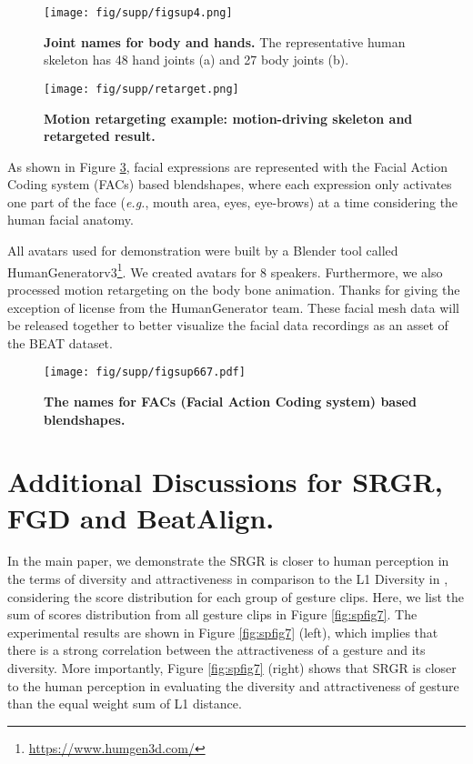 \documentclass[runningheads]{llncs}
\begin{document}
\begin{figure}
\centering
    \texttt{[image: fig/supp/figsup4.png]}
    \caption{\textbf{Joint names for body and hands.} The
representative human skeleton has 48 hand joints (a) and 27 body joints (b).}
    \vspace{-0.5cm}
    \label{fig:spfig3}
\end{figure}

\begin{figure}
\centering
    \texttt{[image: fig/supp/retarget.png]}
    \caption{\textbf{Motion retargeting example: motion-driving skeleton and retargeted result.}}
    \label{fig:spfig5}
\end{figure}

As shown in Figure \ref{fig:spfig4}, facial expressions are represented with the Facial Action Coding system (FACs) based blendshapes, where each expression only activates one part of the face (\textit{e.g.}, mouth area, eyes, eye-brows) at a time considering the human facial anatomy. 

All avatars used for demonstration were built by a Blender tool called HumanGeneratorv3\footnote{\url{https://www.humgen3d.com/}}.
We created avatars for 8 speakers. Furthermore, we also processed motion retargeting on the body bone animation. Thanks for giving the exception of license from the HumanGenerator team. These facial mesh data will be released together to better visualize the facial data recordings as an asset of the BEAT dataset.

\begin{figure}
    \centering
    \texttt{[image: fig/supp/figsup667.pdf]}
    \caption{\textbf{The names for FACs (Facial Action Coding system) based blendshapes.}}
    \label{fig:spfig4}
\end{figure}


\section{Additional Discussions for SRGR, FGD and BeatAlign.}
In the main paper, we demonstrate the SRGR is closer to human perception in the terms of diversity and attractiveness in comparison to the L1 Diversity in \cite{li2021audio2gestures}, considering the score distribution for each group of gesture clips. Here, we list the sum of scores distribution from all gesture clips in Figure \ref{fig:spfig7}. The experimental results are shown in Figure \ref{fig:spfig7} (left), which implies that there is a strong correlation between the attractiveness of a gesture and its diversity. More importantly, Figure \ref{fig:spfig7} (right) shows that SRGR is closer to the human perception in evaluating the diversity and attractiveness of gesture than the equal weight sum of L1 distance.
\end{document}
